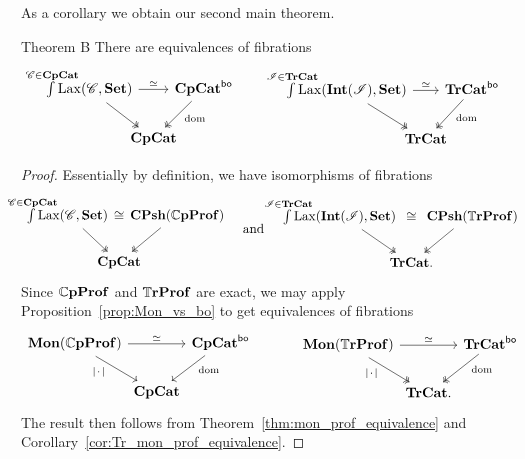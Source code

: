 \documentclass[11pt,oneside,article]{memoir}
\begin{document}
As a corollary we obtain our second main theorem.
\begin{named}{Theorem B}
      \label{thm:TheoremB}
   There are equivalences of fibrations
   \begin{equation*}
      \begin{tikzcd}[column sep=-1em]
         \int\limits^{\mathclap{\cat{C}\in\CompCat}} \Lax(\cat{C},\Set)
               \ar[rr,"\equiv"] \ar[dr,two heads]
            && \CompCat^{\bo} \ar[dl,two heads,"\dom" pos=.4] \\
         & \CompCat &
      \end{tikzcd}
      \qquad\quad
      \begin{tikzcd}[column sep=-1em]
         \int\limits^{\mathclap{\cat{I}\in\TrCat}} \Lax(\Int(\cat{I}),\Set)
               \ar[rr,"\equiv"] \ar[dr,two heads]
            && \TrCat^{\bo} \ar[dl,two heads,"\dom" pos=.4] \\
         & \TrCat &
      \end{tikzcd}
   \end{equation*}
\end{named}
\begin{proof}
   Essentially by definition, we have isomorphisms of fibrations
   \begin{equation*}
      \begin{tikzcd}[column sep=-2em]
         \int\limits^{\mathclap{\cat{C}\in\CompCat}}\Lax(\cat{C},\Set)~
               \ar[rr,phantom,"\iso"] \ar[dr,two heads]
            && ~\CPsh(\dCompProf) \ar[dl,two heads] \\
         & \CompCat &
      \end{tikzcd}
      \quad\text{and}\quad
      \begin{tikzcd}[column sep=-2em]
         \int\limits^{\mathclap{\cat{I}\in\TrCat}}\Lax(\Int(\cat{I}),\Set)~~
               \ar[rr,phantom,"\iso"] \ar[dr,two heads]
            && ~~\CPsh(\dTrProf) \ar[dl,two heads] \\
         & \TrCat. &
      \end{tikzcd}
   \end{equation*}
   Since $\mathbb{C}\mathbf{pProf}$ and $\mathbb{T}\mathbf{rProf}$ are exact, we may apply Proposition~\ref{prop:Mon_vs_bo} to get equivalences of fibrations
   \begin{equation*}
      \begin{tikzcd}[column sep=0em]
         \Mon(\dCompProf) \ar[rr,"\equiv"] \ar[dr,"\MOb"' pos=.3]
            && \CompCat^{\bo} \ar[dl,"\dom" pos=.3] \\
         & \CompCat &
      \end{tikzcd}
      \qquad\quad
      \begin{tikzcd}[column sep=0em]
         \Mon(\dTrProf) \ar[rr,"\equiv"] \ar[dr,two heads,"\MOb"' pos=.3]
            && \TrCat^{\bo} \ar[dl,two heads,"\dom" pos=.3] \\
         & \TrCat. &
      \end{tikzcd}
   \end{equation*}
   The result then follows from Theorem~\ref{thm:mon_prof_equivalence} and Corollary~\ref{cor:Tr_mon_prof_equivalence}.
\end{proof}
\end{document}

